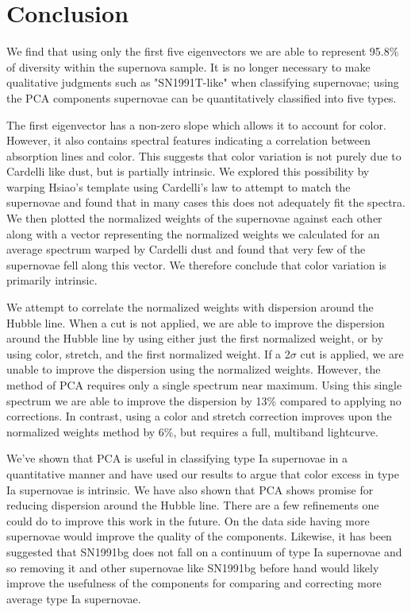 \section{Conclusion}

We find that using only the first five eigenvectors we are able to represent 95.8\% of diversity within the supernova sample. It is no longer necessary to make qualitative judgments such as "SN1991T-like" when classifying supernovae; using the PCA components supernovae can be quantitatively classified into five types.

The first eigenvector has a non-zero slope which allows it to account for color. However, it also contains spectral features indicating a correlation between absorption lines and color. This suggests that color variation is not purely due to Cardelli like dust, but is partially intrinsic. We explored this possibility by warping Hsiao's template using Cardelli's law to attempt to match the supernovae and found that in many cases this does not adequately fit the spectra. We then plotted the normalized weights of the supernovae against each other along with a vector representing the normalized weights we calculated for an average spectrum warped by Cardelli dust and found that very few of the supernovae fell along this vector. We therefore conclude that color variation is primarily intrinsic.

We attempt to correlate the normalized weights with dispersion around the Hubble line. When a cut is not applied, we are able to improve the dispersion around the Hubble line by using either just the first normalized weight, or by using color, stretch, and the first normalized weight. If a 2$\sigma$ cut is applied, we are unable to improve the dispersion using the normalized weights. However, the method of PCA requires only a single spectrum near maximum. Using this single spectrum we are able to improve the dispersion by 13\% compared to applying no corrections. In contrast, using a color and stretch correction improves upon the normalized weights method by 6\%, but requires a full, multiband lightcurve.

We've shown that PCA is useful in classifying type Ia supernovae in a quantitative manner and have used our results to argue that color excess in type Ia supernovae is intrinsic. We have also shown that PCA shows promise for reducing dispersion around the Hubble line. There are a few refinements one could do to improve this work in the future. On the data side having more supernovae would improve the quality of the components. Likewise, it has been suggested that SN1991bg does not fall on a continuum of type Ia supernovae and so removing it and other supernovae like SN1991bg before hand would likely improve the usefulness of the components for comparing and correcting more average type Ia supernovae.

